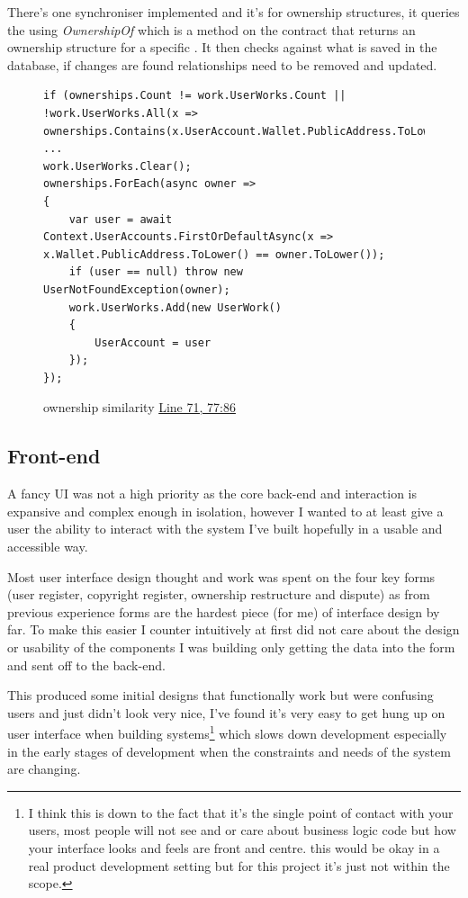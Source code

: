 There's one synchroniser implemented and it's for ownership structures, it queries the  using \textit{OwnershipOf} which is a method on the contract that returns an ownership structure for a specific . It then checks against what is saved in the database, if changes are found relationships need to be removed and updated.

\begin{figure}[H]
\caption{ownership similarity \href{https://github.com/MrHarrisonBarker/CRPL/blob/main/CRPL.Web/Core/ChainSync/Synchronisers/OwnershipSynchroniser.cs}{Line 71, 77:86}}
\centering
\begin{lstlisting}[language=CSharp]
if (ownerships.Count != work.UserWorks.Count || !work.UserWorks.All(x => ownerships.Contains(x.UserAccount.Wallet.PublicAddress.ToLower())))
...
work.UserWorks.Clear();
ownerships.ForEach(async owner =>
{
	var user = await Context.UserAccounts.FirstOrDefaultAsync(x => x.Wallet.PublicAddress.ToLower() == owner.ToLower());
	if (user == null) throw new UserNotFoundException(owner);
	work.UserWorks.Add(new UserWork()
	{
		UserAccount = user
	});
});
\end{lstlisting}
\end{figure}

\subsection{Front-end}

A fancy UI was not a high priority as the core back-end and  interaction is expansive and complex enough in isolation, however I wanted to at least give a user the ability to interact with the system I've built hopefully in a usable and accessible way.

Most user interface design thought and work was spent on the four key forms (user register, copyright register, ownership restructure and dispute) as from previous experience forms are the hardest piece (for me) of interface design by far. To make this easier I counter intuitively at first did not care about the design or usability of the components I was building only getting the data into the form and sent off to the back-end.

This produced some initial designs that functionally work but were confusing users and just didn't look very nice, I've found it's very easy to get hung up on user interface when building systems\footnote{I think this is down to the fact that it's the single point of contact with your users, most people will not see and or care about business logic code but how your interface looks and feels are front and centre. this would be okay in a real product development setting but for this project it's just not within the scope.} which slows down development especially in the early stages of development when the constraints and needs of the system are changing.

